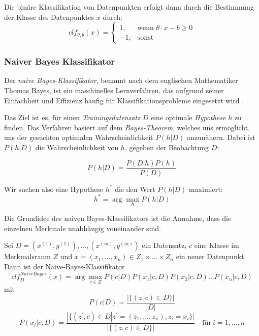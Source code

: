 Die binäre Klassifikation von Datenpunkten erfolgt dann durch die Bestimmung der Klasse des Datenpunktes $x$ durch:
\begin{equation*}
    clf_{\theta, b}(x) =
    \begin{cases}
        1, & \text{wenn } \theta \cdot x - b \geq 0 \\
        -1, & \text{sonst}
    \end{cases}
\end{equation*}

\subsubsection{Naiver Bayes Klassifikator}
Der \textit{naive Bayes-Klassifikator}, benannt nach dem englischen Mathematiker Thomas Bayes, ist ein maschinelles Lernverfahren, das aufgrund seiner Einfachheit und Effizienz häufig für Klassifikationsprobleme eingesetzt wird \cite{wankhade2022survey, medhat2014sentiment, zimbra2018state}.

Das Ziel ist es, für einen \textit{Trainingsdatensatz} $D$ eine optimale \textit{Hypothese} $h$ zu finden. Das Verfahren basiert auf dem \textit{Bayes-Theorem}, welches uns ermöglicht, uns der gesuchten optimalen Wahrscheinlichkeit $P(h|D)$ anzunähern. Dabei ist $P(h|D)$ die Wahrscheinlichkeit von $h$, gegeben der Beobachtung $D$:

\begin{equation*}
    P(h|D) = \frac{P(D|h)P(h)}{P(D)}
\end{equation*}

Wir suchen also eine Hypothese $h^*$ die den Wert $P(h|D)$ maximiert:
\begin{equation*}
    h^* = \arg\max_{h} P(h|D)
\end{equation*}

Die Grundidee des naiven Bayes-Klassifikators ist die Annahme, dass die einzelnen Merkmale unabhängig voneinander sind.

Sei $D = (x^{(1)}, y^{(1)}), \dots, (x^{(m)}, y^{(m)})$ ein Datensatz, $c$ eine Klasse im Merkmalsraum $Z$  und $x=(x_1, \dots,x_n)\in Z_1 \times \dots \times Z_n$ ein neuer Datenpunkt. Dann ist der Naive-Bayes-Klassifikator
\begin{equation*}
    clf_D^{NaiveBayes}(x) = \arg \max_{c\in Z} P(c|D)P(x_1|c,D)P(x_2|c,D) \dots P(x_n|c,D)
\end{equation*}
mit
\begin{equation*}
    P(c|D) = \frac{|\{(z,c)\in D\}|}{|D|}
\end{equation*}
\begin{equation*}
    P(x_i|c,D) = \frac{|\{(z^\prime,c)\in D| z^\prime = (z_1, \dots, z_n), z_i=x_i \}|}{|\{(z,c)\in D\}|} \quad \text{für} \: i = 1, \dots, n
\end{equation*}

